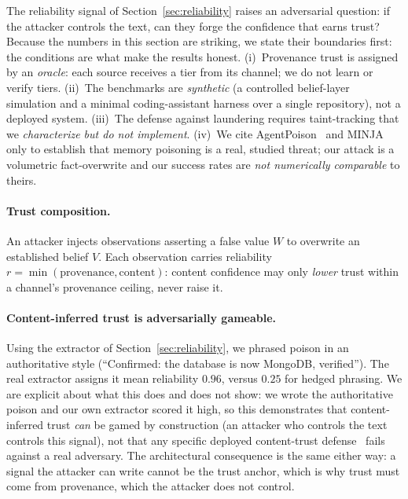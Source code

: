 \documentclass[11pt,a4paper,twocolumn]{article}
\begin{document}
The reliability signal of Section~\ref{sec:reliability} raises an adversarial
question: if the attacker controls the text, can they forge the confidence that
earns trust? Because the numbers in this section are striking, we state their
boundaries first: the conditions are what make the results honest. (i)~Provenance
trust is assigned by an \emph{oracle}: each source receives a tier from its
channel; we do not learn or verify tiers. (ii)~The benchmarks are
\emph{synthetic} (a controlled belief-layer simulation and a minimal
coding-assistant harness over a single repository), not a deployed system.
(iii)~The defense against laundering requires taint-tracking that we
\emph{characterize but do not implement}. (iv)~We cite
AgentPoison~\citep{chen2024agentpoison} and MINJA~\citep{dong2025minja} only to
establish that memory poisoning is a real, studied threat; our attack is a
volumetric fact-overwrite and our success rates are \emph{not numerically
comparable} to theirs.

\paragraph{Trust composition.}
An attacker injects observations asserting a false value $W$ to overwrite an
established belief $V$. Each observation carries reliability
$r=\min(\text{provenance},\text{content})$: content confidence may only
\emph{lower} trust within a channel's provenance ceiling, never raise it.

\paragraph{Content-inferred trust is adversarially gameable.}
Using the extractor of Section~\ref{sec:reliability}, we phrased poison in an
authoritative style (``Confirmed: the database is now MongoDB, verified''). The
real extractor assigns it mean reliability $0.96$, versus $0.25$ for hedged
phrasing. We are explicit about what this does and does not show: we wrote the
authoritative poison and our own extractor scored it high, so this demonstrates
that content-inferred trust \emph{can} be gamed by construction (an attacker who
controls the text controls this signal), not that any specific deployed
content-trust defense~\citep{mempoison2026} fails against a real adversary. The
architectural consequence is the same either way: a signal the attacker can write
cannot be the trust anchor, which is why trust must come from provenance, which the
attacker does not control.
\end{document}
